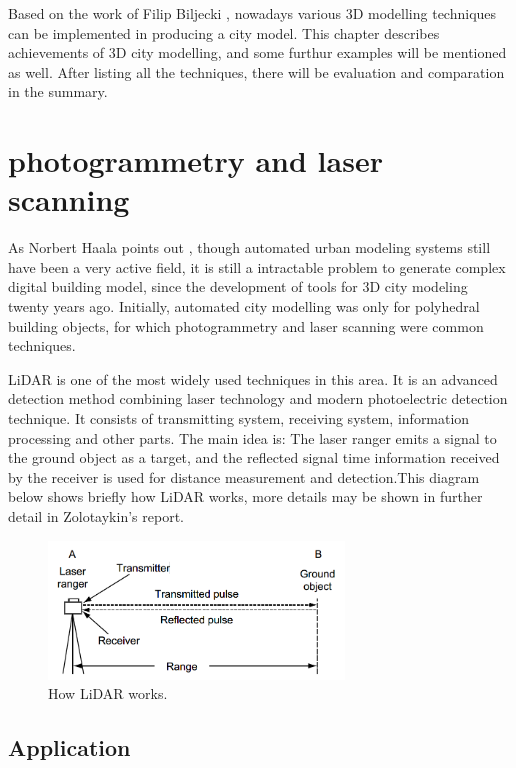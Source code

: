 Based on the work of Filip Biljecki \cite{biljecki2015applications}, nowadays various 3D modelling techniques can be implemented in producing a city model. This chapter describes achievements of 3D city modelling, and some furthur examples will be mentioned as well. After listing all the techniques, there will be evaluation and comparation in the summary.

\section{photogrammetry and laser scanning}

As Norbert Haala points out \cite{haala2010update}, though automated urban modeling systems still have been a very active field, it is still a intractable problem to generate complex digital building model, since the development of tools for 3D city modeling twenty years ago. Initially, automated city modelling was only for polyhedral building objects, for which photogrammetry and laser scanning were common techniques.   

LiDAR is one of the most widely used techniques in this area. It is an advanced detection method combining laser technology and modern photoelectric detection technique. It consists of transmitting system, receiving system, information processing and other parts. The main idea is: The laser ranger emits a signal to the ground object as a target, and the reflected signal time information received by the receiver is used for distance measurement and detection.This diagram below shows briefly how LiDAR works, more details may be shown in further detail in Zolotaykin's report.

\begin{figure}[htb]
	\centering
	\includegraphics[width=0.7\textwidth]{gfx/LiDAR}  	  	 	
	\caption{How LiDAR works.}
	\label{fig:example1}
\end{figure}



\subsection{Application}

